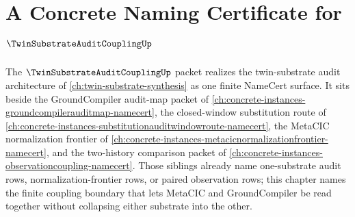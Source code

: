 \chapter{A Concrete Naming Certificate for $\TwinSubstrateAuditCouplingUp$}
\label{ch:concrete-instances-twinsubstrateauditcoupling-namecert}

The $\TwinSubstrateAuditCouplingUp$ packet realizes the twin-substrate audit architecture of \autoref{ch:twin-substrate-synthesis} as one finite NameCert surface. It sits beside the GroundCompiler audit-map packet of \autoref{ch:concrete-instances-groundcompilerauditmap-namecert}, the closed-window substitution route of \autoref{ch:concrete-instances-substitutionauditwindowroute-namecert}, the MetaCIC normalization frontier of \autoref{ch:concrete-instances-metacicnormalizationfrontier-namecert}, and the two-history comparison packet of \autoref{ch:concrete-instances-observationcoupling-namecert}. Those siblings already name one-substrate audit rows, normalization-frontier rows, or paired observation rows; this chapter names the finite coupling boundary that lets MetaCIC and GroundCompiler be read together without collapsing either substrate into the other.

